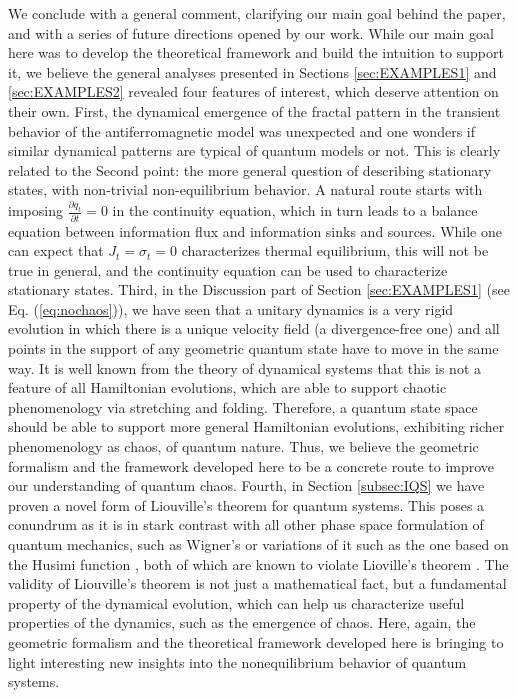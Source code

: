 \documentclass[%
 reprint,
 superscriptaddress,
 aps,
 pra,
]{revtex4-2}
\theoremstyle{definition}
\begin{document}
We conclude with a general comment, clarifying our main goal behind the paper, and with a series of future directions
opened by our work. While our main goal here was to develop the theoretical framework and build the intuition to 
support it, we believe the general analyses presented in Sections \ref{sec:EXAMPLES1} and \ref{sec:EXAMPLES2} 
revealed four features of interest, which deserve attention on their own. First, the dynamical emergence of the 
fractal pattern in the transient behavior of the antiferromagnetic model was unexpected and one wonders
if similar dynamical patterns are typical of quantum models or not. This is clearly related to the Second point: 
the more general question of describing stationary states, with non-trivial non-equilibrium behavior.
A natural route starts with imposing $\frac{\partial q_t}{\partial t} = 0$ in the continuity equation, which in turn 
leads to a balance equation between information flux and information sinks and sources. While one
can expect that $J_t=\sigma_t=0$ characterizes thermal equilibrium, this will not be true in general, and the
continuity equation can be used to characterize stationary states. Third, in the Discussion part of Section \ref{sec:EXAMPLES1} (see 
Eq. (\ref{eq:nochaos})), we have seen that a unitary dynamics is a very rigid evolution in which there is a unique
velocity field (a divergence-free one) and all points in the support of any geometric quantum state have to 
move in the same way. It is well known from the theory of dynamical systems that this is not a feature of all
Hamiltonian evolutions, which are able to support chaotic phenomenology via stretching and folding. Therefore, 
a quantum state space should be able to support more general Hamiltonian evolutions, exhibiting richer phenomenology
as chaos, of quantum nature. Thus, we believe the geometric formalism and the framework developed here to 
be a concrete route to improve our understanding of quantum chaos. Fourth, in Section \ref{subsec:IQS} we have 
proven a novel form of Liouville's theorem for quantum systems. This poses a conundrum as it is in stark contrast with 
all other phase space formulation of quantum mechanics, such as Wigner's \cite{Wigner1932QuantumCorrectionThermodynamic} or variations of it such as 
the one based on the Husimi function \cite{HUSIMI1940FormalPropertiesDensity}, both of which are known to violate Lioville's theorem \cite{Oliva2018AnharmonicQuantumMechanical}. 
The validity of Liouville's theorem is not just a mathematical fact, but a fundamental property of the dynamical 
evolution, which can help us characterize useful properties of the dynamics, such as the emergence of chaos. 
Here, again, the geometric formalism and the theoretical framework developed here is bringing to light interesting
new insights into the nonequilibrium behavior of quantum systems. 
\end{document}
